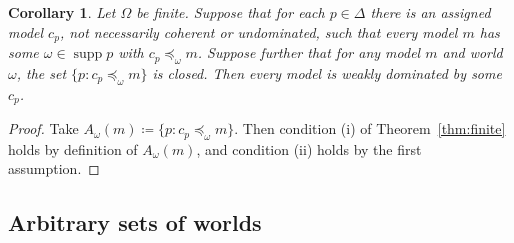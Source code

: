 \documentclass[11pt]{article}
\newtheorem{corollary}[theorem]{Corollary}
\theoremstyle{definition}
\newcommand{\supp}{\operatorname{supp}}
\begin{document}
\begin{corollary}\label{cor:closed-choice}
Let $\Omega$ be finite. Suppose that for each $p\in\Delta$ there is an assigned model $c_p$, not necessarily coherent or undominated, such that every model $m$ has some $\omega\in\supp p$ with $c_p\preceq_\omega m$. Suppose further that for any model $m$ and world $\omega$, the set $\{p:c_p\preceq_\omega m\}$ is closed. Then every model is weakly dominated by some $c_p$.
\end{corollary}
\begin{proof}
Take $A_\omega(m)\coloneqq\{p:c_p\preceq_\omega m\}$. Then condition (i) of Theorem~\ref{thm:finite} holds by definition of $A_\omega(m)$, and condition (ii) holds by the first assumption.
\end{proof}

\subsection{Arbitrary sets of worlds}
\end{document}

